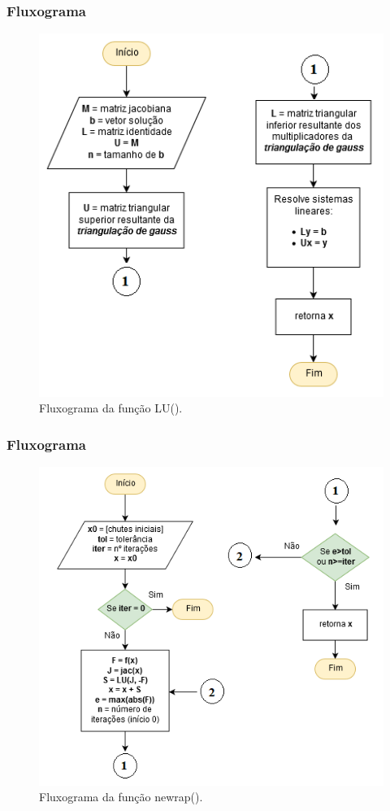\documentclass[aspectratio=1610]{beamer}
\begin{document}

\begin{frame}
\frametitle{Fluxograma}


\begin{figure}
  \centering
  \includegraphics[scale=0.6]{Imagens/diag_LU1.png}
  \caption{Fluxograma da função LU().}
\end{figure}


\end{frame}



\begin{frame}
\frametitle{Fluxograma}


\begin{figure}
  \centering
  \includegraphics[scale=0.6]{Imagens/diag_new1.png}
  \caption{Fluxograma da função newrap().}
\end{figure}


\end{frame}
\end{document}
